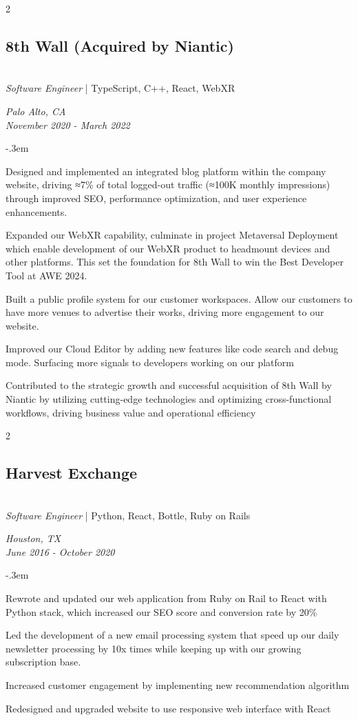 \documentclass{article}
\let\olditemize=\itemize \let\endolditemize=\enditemize
\renewenvironment{itemize}{\olditemize[topsep=0em] \itemsep-.3em}{\endolditemize}
\newenvironment{twocolentry}[2][]{
    \def\secondColumn{#2}
    \raggedright
    \setcolumnwidth{\fill, 6cm}
    \begin{paracol}{2}
}{
    \switchcolumn \raggedleft \secondColumn
    \end{paracol}
} %
\begin{document}
\begin{twocolentry}{
  \textit{Palo Alto, CA} \\
  \textit{November 2020 - March 2022}
}
\subsection{8th Wall (Acquired by Niantic)}\hfill\\
\textit{Software Engineer} | TypeScript, C++, React, WebXR
\end{twocolentry}
\begin{itemize}
  \item Designed and implemented an integrated blog platform within the company website, driving
  ≈7\% of total logged-out traffic (≈100K monthly impressions) through improved SEO, performance
  optimization, and user experience enhancements.
  \item Expanded our WebXR capability, culminate in project Metaversal Deployment which enable
  development of our WebXR product to headmount devices and other platforms. This set the foundation
  for 8th Wall to win the Best Developer Tool at AWE 2024.
  \item Built a public profile system for our customer workspaces. Allow our customers to have more
  venues to advertise their works, driving more engagement to our website. 
  \item Improved our Cloud Editor by adding new features like code search and debug mode. Surfacing
  more signals to developers working on our platform
  \item Contributed to the strategic growth and successful acquisition of 8th Wall by Niantic by
  utilizing cutting-edge technologies and optimizing cross-functional workflows, driving business
  value and operational efficiency
\end{itemize}

\begin{twocolentry}{
  \textit{Houston, TX} \\
  \textit{June 2016 - October 2020} \\
}
\subsection{Harvest Exchange}\hfill\\
\textit{Software Engineer} | Python, React, Bottle, Ruby on Rails
\end{twocolentry}
\begin{itemize}
  \item Rewrote and updated our web application from Ruby on Rail to React with Python stack, which
  increased our SEO score and conversion rate by 20\%
  \item Led the development of a new email processing system that speed up our daily newsletter
  processing by 10x times while keeping up with our growing subscription base.
  \item Increased customer engagement by implementing new recommendation algorithm
  \item Redesigned and upgraded website to use responsive web interface with React
\end{itemize}
\end{document}
